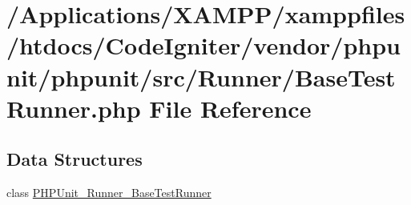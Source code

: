 \hypertarget{_base_test_runner_8php}{}\section{/\+Applications/\+X\+A\+M\+P\+P/xamppfiles/htdocs/\+Code\+Igniter/vendor/phpunit/phpunit/src/\+Runner/\+Base\+Test\+Runner.php File Reference}
\label{_base_test_runner_8php}
\subsection*{Data Structures}
\begin{DoxyCompactItemize}
\item 
class \mbox{\hyperlink{class_p_h_p_unit___runner___base_test_runner}{P\+H\+P\+Unit\+\_\+\+Runner\+\_\+\+Base\+Test\+Runner}}
\end{DoxyCompactItemize}
